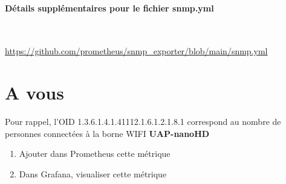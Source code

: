 \documentclass[french, 12pt]{article}%
\newif\ifPROF
\begin{document}
 
\paragraph{Détails supplémentaires pour le fichier snmp.yml} \  

\href{https://github.com/prometheus/snmp_exporter/blob/main/snmp.yml}{https://github.com/prometheus/snmp\_exporter/blob/main/snmp.yml}


\section{A vous}
Pour rappel, l'OID 1.3.6.1.4.1.41112.1.6.1.2.1.8.1 correspond au nombre de personnes connectées à la borne WIFI \textbf{UAP-nanoHD}

\begin{enumerate}
\item Ajouter dans Prometheus cette métrique
\item Dans Grafana, visualiser cette métrique
\end{enumerate}

\ifPROF
\color{red}
\begin{lstlisting}[style=commande] 
#snmpwalk -v2c -c public 192.168.1.73 1.3.6.1.4.1.41112.1.6.1.2.1.8.1
snmpwalk -v2c -c public 192.168.1.31 1.3.6.1.4.1.41112.1.6.1.2.1.8.2
\end{lstlisting}
\normalcolor
\fi
\end{document}

